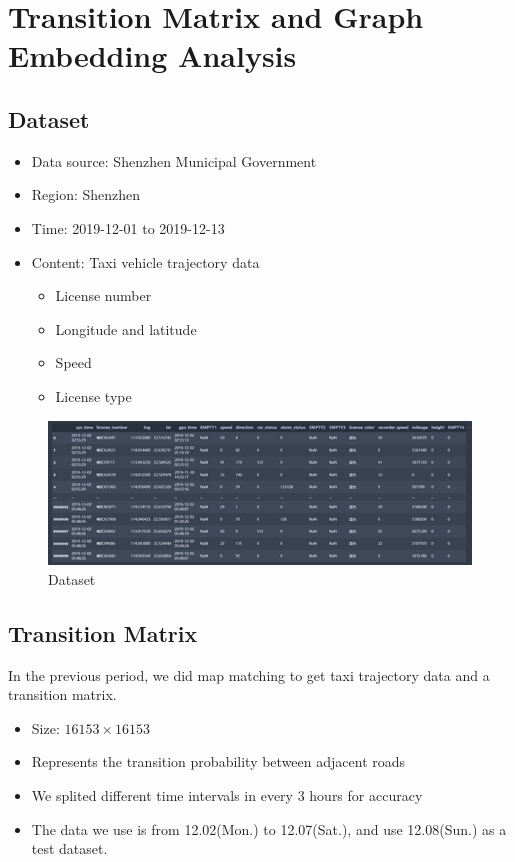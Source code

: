 \documentclass[fontset=none]{ctexart}
\theoremstyle{definition}
\theoremstyle{remark}
\begin{document}
\clearpage
\section{Transition Matrix and Graph Embedding Analysis}
\subsection{Dataset}
\begin{itemize}
  \item Data source: Shenzhen Municipal Government 
  \item Region: Shenzhen
  \item Time: 2019-12-01 to 2019-12-13
  \item Content: Taxi vehicle trajectory data
    \begin{itemize}
      \item License number
      \item Longitude and latitude
      \item Speed
      \item License type
    \end{itemize}
\end{itemize}

\begin{figure}[htb]
  \centering
  \includegraphics[width=\textwidth]{images/7-2-1.png}
  \caption{Dataset}
  \label{fig: 721}
\end{figure}

\subsection{Transition Matrix}
In the previous period, we did map matching to get taxi trajectory data and a transition matrix.
\begin{itemize}
  \item Size: $16153\times 16153$
  \item Represents the transition probability between adjacent roads
  \item We splited different time intervals in every 3 hours for accuracy
  \item The data we use is from 12.02(Mon.) to 12.07(Sat.), and use 12.08(Sun.) as a test dataset.
\end{itemize}
\end{document}
